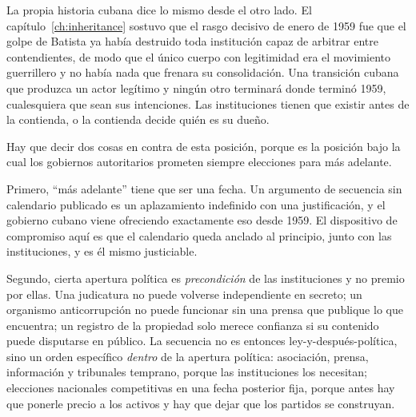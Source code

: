La propia historia cubana dice lo mismo desde el otro lado. El
capítulo~\ref{ch:inheritance} sostuvo que el rasgo decisivo de enero de 1959 fue que
el golpe de Batista ya había destruido toda institución capaz de arbitrar entre
contendientes, de modo que el único cuerpo con legitimidad era el movimiento
guerrillero y no había nada que frenara su consolidación. Una transición cubana que
produzca un actor legítimo y ningún otro terminará donde terminó 1959, cualesquiera
que sean sus intenciones. Las instituciones tienen que existir antes de la contienda,
o la contienda decide quién es su dueño.

Hay que decir dos cosas en contra de esta posición, porque es la posición bajo la
cual los gobiernos autoritarios prometen siempre elecciones para más adelante.

Primero, ``más adelante'' tiene que ser una fecha. Un argumento de secuencia sin
calendario publicado es un aplazamiento indefinido con una justificación, y el
gobierno cubano viene ofreciendo exactamente eso desde 1959. El dispositivo de
compromiso aquí es que el calendario queda anclado al principio, junto con las
instituciones, y es él mismo justiciable.

Segundo, cierta apertura política es \emph{precondición} de las instituciones y no
premio por ellas. Una judicatura no puede volverse independiente en secreto; un
organismo anticorrupción no puede funcionar sin una prensa que publique lo que
encuentra; un registro de la propiedad solo merece confianza si su contenido puede
disputarse en público. La secuencia no es entonces ley-y-después-política, sino un
orden específico \emph{dentro} de la apertura política: asociación, prensa,
información y tribunales temprano, porque las instituciones los necesitan;
elecciones nacionales competitivas en una fecha posterior fija, porque antes hay que
ponerle precio a los activos y hay que dejar que los partidos se construyan.


